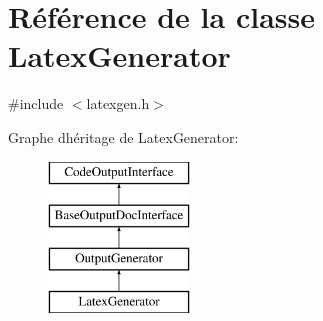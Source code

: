 \hypertarget{class_latex_generator}{}\section{Référence de la classe Latex\+Generator}
\label{class_latex_generator}


{\ttfamily \#include $<$latexgen.\+h$>$}

Graphe d\textquotesingle{}héritage de Latex\+Generator\+:\begin{figure}[H]
\begin{center}
\leavevmode
\includegraphics[height=4.000000cm]{class_latex_generator}
\end{center}
\end{figure}
